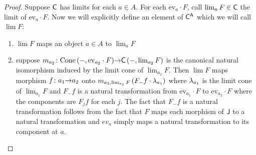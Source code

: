 \documentclass{article}
\begin{document}
\begin{proof}
	
	Suppose $\mathsf{C}$ has limits for each $a \in A$. For each $\text{ev}_{a} \cdot F$, call $\lim_{a} F \in \mathsf{C}$ the limit of $\text{ev}_{a} \cdot F$. Now we will explicitly define an element of $\mathsf{C}^{\mathsf{A}}$ which we will call $\lim F$:
	
		\begin{enumerate}
		\item $\lim F$ maps an object $a \in A$ to $\lim_{a} F$
		\item suppose ${m_{a_2}}\colon{\text{Cone}\left({-,\text{ev}_{a_2} \cdot F}\right)}{\to}{\mathsf{C}\left({-,\lim_{a_2} F}\right)}$ is the canonical natural isomorphism induced by the limit cone of $\lim_{a_2} F$. Then $\lim F$ maps morphism ${f}\colon{a_1}{\to}{a_2}$ onto $m_{a_2,\lim_{a_1} F}\left({F_{-}f \cdot \lambda_{a_1}}\right)$ where $\lambda_{a_1}$ is the limit cone of $\lim_{a_1} F$ and $F_{-}f$ is a natural transformation from $\text{ev}_{a_1} \cdot F $ to $\text{ev}_{a_2} \cdot F $ where the components are $F_{j}f$ for each $j$. The fact that $F_{-}f$ is a natural transformation follows from the fact that $F$ maps each morphism of $\mathsf{J}$ to a natural transformation and $ev_{a}$ simply maps a natural transformation to its component at $a$.
	
		
		
	\end{enumerate}


\end{proof}
\end{document}

